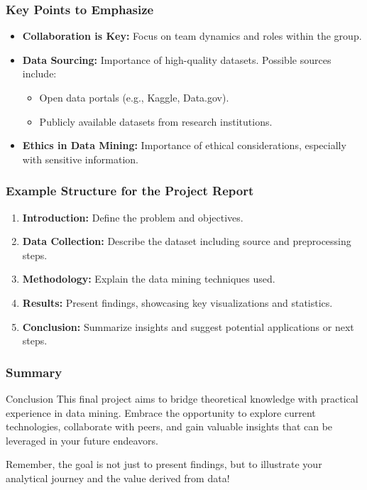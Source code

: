 \documentclass{beamer}
\begin{document}
\begin{frame}[fragile]
    \frametitle{Key Points to Emphasize}
    \begin{itemize}
        \item \textbf{Collaboration is Key:} Focus on team dynamics and roles within the group.
        \item \textbf{Data Sourcing:} Importance of high-quality datasets. Possible sources include:
        \begin{itemize}
            \item Open data portals (e.g., Kaggle, Data.gov).
            \item Publicly available datasets from research institutions.
        \end{itemize}
        \item \textbf{Ethics in Data Mining:} Importance of ethical considerations, especially with sensitive information.
    \end{itemize}
\end{frame}

\begin{frame}[fragile]
    \frametitle{Example Structure for the Project Report}
    \begin{enumerate}
        \item \textbf{Introduction:} Define the problem and objectives.
        \item \textbf{Data Collection:} Describe the dataset including source and preprocessing steps.
        \item \textbf{Methodology:} Explain the data mining techniques used.
        \item \textbf{Results:} Present findings, showcasing key visualizations and statistics.
        \item \textbf{Conclusion:} Summarize insights and suggest potential applications or next steps.
    \end{enumerate}
\end{frame}

\begin{frame}[fragile]
    \frametitle{Summary}
    \begin{block}{Conclusion}
        This final project aims to bridge theoretical knowledge with practical experience in data mining. Embrace the opportunity to explore current technologies, collaborate with peers, and gain valuable insights that can be leveraged in your future endeavors.
    \end{block}
    Remember, the goal is not just to present findings, but to illustrate your analytical journey and the value derived from data!
\end{frame}
\end{document}
